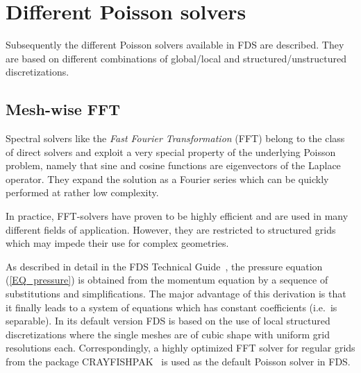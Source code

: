 \section{Different Poisson solvers}
\label{SEC_SCARC_poisson}

Subsequently the different Poisson solvers available in FDS are described. They are based on different combinations of global/local and structured/unstructured discretizations.


\subsection{Mesh-wise FFT}

Spectral solvers like the {\it Fast Fourier Transformation} (FFT) belong to the class of direct solvers and exploit a very special property of the underlying Poisson problem, namely that sine and cosine functions are eigenvectors of the Laplace operator. They expand the solution as a Fourier series which can be quickly performed at rather low complexity. 

In practice, FFT-solvers have proven to be highly efficient and are used in many different fields of application. However, they are restricted to structured grids which may impede their use for complex geometries.

As described in detail in the FDS Technical Guide~\cite{McGrattan:2018:TG}, the pressure equation (\ref{EQ_pressure}) is obtained from the momentum equation by a sequence of substitutions and simplifications. The major advantage of this derivation is that it finally leads to a system of equations which has constant coefficients (i.e.\ is separable). In its default version FDS is based on the use of local structured discretizations where the single meshes are of cubic shape with uniform grid resolutions each. Correspondingly, a highly optimized FFT solver for regular grids from the package CRAYFISHPAK~\cite{Sweet::Crayfishpak} is used as the default Poisson solver in FDS.

